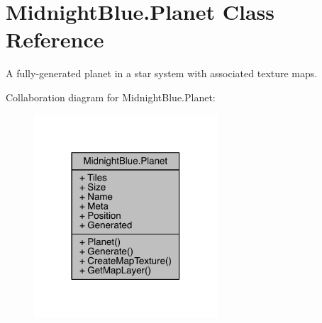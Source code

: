 \hypertarget{class_midnight_blue_1_1_planet}{}\section{Midnight\+Blue.\+Planet Class Reference}
\label{class_midnight_blue_1_1_planet}


A fully-\/generated planet in a star system with associated texture maps.  




Collaboration diagram for Midnight\+Blue.\+Planet\+:\nopagebreak
\begin{figure}[H]
\begin{center}
\leavevmode
\includegraphics[width=194pt]{class_midnight_blue_1_1_planet__coll__graph}
\end{center}
\end{figure}
